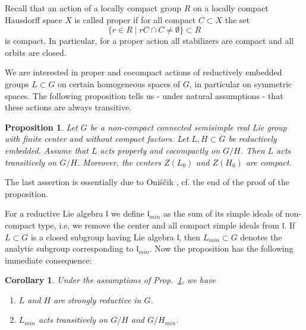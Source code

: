 \documentclass[10]{amsart}
\newtheorem{cor}[thm]{Corollary}
\newtheorem{pro}[thm]{Proposition}
\theoremstyle{remark}
\theoremstyle{definition}
\numberwithin{equation}{section}
\newcommand{\fl}{{\mathfrak l}}
\begin{document}
{Recall that an action of a locally compact group $R$ on a locally compact Hausdorff space $X$ is called proper if for all compact $C\subset X$ the set
$$   \{r\in R\mid  rC\cap C\ne\emptyset\}\subset R$$
is compact. In particular, for a proper action all stabilizers are compact and all orbits are closed.


We are interested in proper and cocompact actions of reductively embedded groups $L\subset G$ on certain homogeneous spaces
of $G$, in particular on symmetric spaces. The 
following proposition tells us - under natural assumptions - that these actions are always transitive.

 
\begin{pro}\label{cocpt}
Let $G$ be a non-compact connected semisimple real Lie group with finite center and without compact factors. Let $L,H\subset G$ be  reductively embedded. 
Assume that $L$ acts properly and cocompactly on $G/H$. Then $L$ acts transitively on $G/H$. Moreover, the centers $Z(L_0)$ and $Z(H_0)$ are compact.
\end{pro} 
%
The last assertion is essentially due to Oni\v s\v cik \cite{Oni69}, cf. the end of the proof of the proposition.

For a reductive Lie algebra $\fl$ we define $\fl_{min}$ as the sum of its simple ideals of non-compact type, i.e. we remove the center and all compact simple
ideals from $\fl$. If $L\subset G$ is a closed subgroup having Lie algebra  $\fl$, then $L_{min}\subset G$ denotes the analytic subgroup corresponding to $\fl_{min}$. 
Now the proposition has the following immediate consequence:
\begin{cor}\label{unfug}
Under the assumptions of Prop.~\ref{cocpt}, we have
\begin{enumerate}
\item[(i)] $L$ and $H$ are strongly reductive in $G$.
\item[(ii)] $L_{min}$ acts transitively on $G/H$ and $G/H_{min}$.
\end{enumerate}
\end{cor}

}
\end{document}
